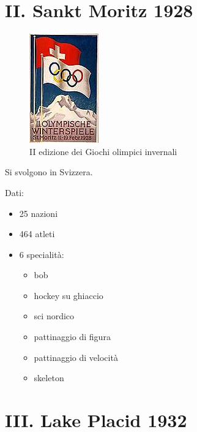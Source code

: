 \documentclass[
]{book}
\providecommand{\tightlist}{%
  \setlength{\itemsep}{0pt}\setlength{\parskip}{0pt}}
\begin{document}
\chapter*{II. Sankt Moritz 1928}\label{ii.-sankt-moritz-1928}

\begin{figure}
\includegraphics[width=0.4\linewidth]{images/loghi/1928} \caption{II edizione dei Giochi olimpici invernali}\label{fig:unnamed-chunk-9}
\end{figure}

Si svolgono in Svizzera.

Dati:

\begin{itemize}
\tightlist
\item
  25 nazioni
\item
  464 atleti
\item
  6 specialità:

  \begin{itemize}
  \tightlist
  \item
    bob
  \item
    hockey su ghiaccio
  \item
    sci nordico
  \item
    pattinaggio di figura
  \item
    pattinaggio di velocità
  \item
    skeleton
  \end{itemize}
\end{itemize}

\chapter*{III. Lake Placid 1932}\label{iii.-lake-placid-1932}
\end{document}
